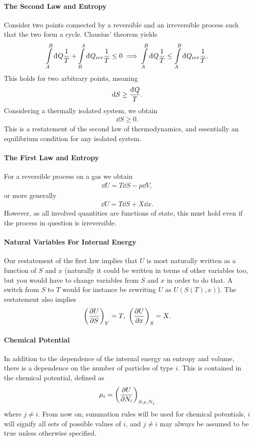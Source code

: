 \paragraph{The Second Law and Entropy}
Consider two points connected by a reversible and an irreversible process such that the two form a cycle. Clausius' theorem yields
\begin{align*}
	\intin{A}{B}{Q}{\frac{1}{T}} + \intin{B}{A}{Q_{\text{rev}}}{\frac{1}{T}} \leq 0 \implies \intin{A}{B}{Q}{\frac{1}{T}} \leq \intin{A}{B}{Q_{\text{rev}}}{\frac{1}{T}}.
\end{align*}
This holds for two arbitrary points, meaning
\begin{align*}
	\dd{S} \geq \frac{\din{Q}}{T}.
\end{align*}
Considering a thermally isolated system, we obtain
\begin{align*}
	\dd{S} \geq 0.
\end{align*}
This is a restatement of the second law of thermodynamics, and essentially an equilibrium condition for any isolated system.

\paragraph{The First Law and Entropy}
For a reversible process on a gas we obtain
\begin{align*}
	\dd{U} = T\dd{S} - p\dd{V},
\end{align*}
or more generally
\begin{align*}
	\dd{U} = T\dd{S} + X\dd{x}.
\end{align*}
However, as all involved quantities are functions of state, this must hold even if the process in question is irreversible.

\paragraph{Natural Variables For Internal Energy}
Our restatement of the first law implies that $U$ is most naturally written as a function of $S$ and $x$ (naturally it could be written in terms of other variables too, but you would have to change variables from $S$ and $x$ in order to do that. A switch from $S$ to $T$ would for instance be rewriting $U$ as $U(S(T), x)$). The restatement also implies
\begin{align*}
	\fix{\pdv{U}{S}}{V} = T,\ \fix{\pdv{U}{x}}{S} = X.
\end{align*}

\paragraph{Chemical Potential}
In addition to the dependence of the internal energy on entropy and volume, there is a dependence on the number of particles of type $i$. This is contained in the chemical potential, defined as
\begin{align*}
	\mu_{i} = \fix{\pdv{U}{N_{i}}}{S, x, N_{j}}
\end{align*}
where $j \neq i$. From now on, summation rules will be used for chemical potentials, $i$ will signify all sets of possible values of $i$, and $j\neq i$ may always be assumed to be true unless otherwise specified.

